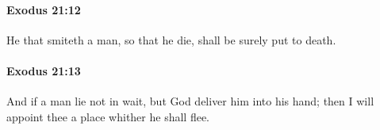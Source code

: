 		\paragraph{Exodus 21:12} %
			\label{EXODUS-21-12}

			He that smiteth a man, so that he die, shall be surely put to death.


		\paragraph{Exodus 21:13} %
			\label{EXODUS-21-13}

			And if a man lie not in wait, but God deliver him into his hand; then I will appoint thee a place whither he shall flee.


